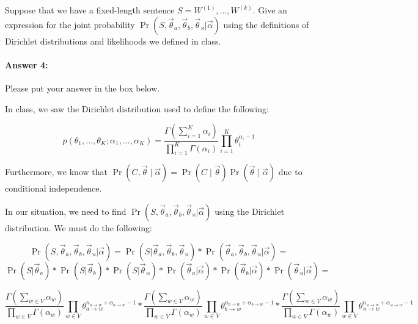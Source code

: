 \documentclass[10pt]{article}
\newenvironment{AnswerBox}{\begin{mdframed}[style=simple]}{\end{mdframed}}
\begin{document}
 Suppose that we have a fixed-length sentence
$S=W^{(1)},\dots,W^{(k)}$. Give an expression for the joint
probability
$\Pr(S, \vec{\theta}_{a}, \vec{\theta}_{b}, \vec{\theta}_{\rtimes} |
\vec{\alpha})$
using the definitions of Dirichlet distributions and likelihoods we
defined in class.

\paragraph{Answer 4:} Please put your answer in the box below.


\begin{AnswerBox}%

In class, we saw the Dirichlet distribution used to define the following:

$$p\left(\theta_{1},\ldots ,\theta_{K};\alpha _{1},\ldots ,\alpha _{K}\right)= \frac{\Gamma(\sum_{i=1}^K \alpha_i)}{\prod_{i=1}^{K} \Gamma(\alpha_i)} \prod _{i=1}^{K}\theta_{i}^{\alpha _{i}-1}$$

Furthermore, we know that $\Pr(C,\vec{\theta} \mid \vec{\alpha}) = \Pr(C\mid \vec{\theta})\Pr(\vec{\theta} \mid \vec{\alpha})$ due to conditional independence.


In our situation, we need to find $\Pr(S, \vec{\theta}_{a}, \vec{\theta}_{b}, \vec{\theta}_{\rtimes} |
\vec{\alpha})$ using the Dirichlet distribution. We must do the following:

$$\Pr(S, \vec{\theta}_{a}, \vec{\theta}_{b}, \vec{\theta}_{\rtimes} |
\vec{\alpha}) =
\Pr(S | \vec{\theta}_{a}, \vec{\theta}_{b}, \vec{\theta}_{\rtimes}) *
\Pr(\vec{\theta}_{a}, \vec{\theta}_{b}, \vec{\theta}_{\rtimes} | \vec{\alpha}) =
$$
$$
\Pr(S | \vec{\theta}_{a}) *
\Pr(S | \vec{\theta}_{b}) *
\Pr(S | \vec{\theta}_{ \rtimes}) *
\Pr(\vec{\theta}_{a} | \vec{\alpha}) *
\Pr(\vec{\theta}_{b} | \vec{\alpha}) *
\Pr(\vec{\theta}_{\rtimes} | \vec{\alpha}) =
$$

$$
\frac{\Gamma(\sum_{w \in V} \alpha_w)}{\prod_{w \in V} \Gamma(\alpha_w)} 
\prod _{w \in V} \theta_{a \rightarrow w}^{n_{a \rightarrow w} + \alpha_{a \rightarrow w} -1} *
\frac{\Gamma(\sum_{w \in V} \alpha_w)}{\prod_{w \in V} \Gamma(\alpha_w)} 
\prod _{w \in V} \theta_{b \rightarrow w}^{n_{b \rightarrow w} + \alpha_{b \rightarrow w} -1} *
\frac{\Gamma(\sum_{w \in V} \alpha_w)}{\prod_{w \in V} \Gamma(\alpha_w)} 
\prod _{w \in V} \theta_{\rtimes \rightarrow w}^{n_{\rtimes \rightarrow w} + \alpha_{\rtimes \rightarrow w} -1}
$$


\end{AnswerBox}
\end{document}
